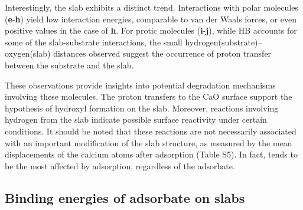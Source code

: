 \documentclass[%
aip,
amsmath,amssymb,
preprint,%
jcp,
showkeys,
]{revtex4-2}
\begin{document}
Interestingly, the  slab exhibits a distinct trend. Interactions with polar molecules (\textbf{e}-\textbf{h}) yield low interaction energies, comparable to van der Waals forces, or even positive values in the case of \textbf{h}. For protic molecules (\textbf{i}-\textbf{j}), while HB accounts for some of the slab-substrate interactions, the small hydrogen(substrate)--oxygen(slab) distances observed suggest the occurrence of proton transfer between the substrate and the slab.

These observations provide insights into potential degradation mechanisms involving these molecules. The proton transfers to the CaO surface support the hypothesis of hydroxyl formation on the slab. Moreover, reactions involving hydrogen from the  slab indicate possible surface reactivity under certain conditions.  It should be noted that these reactions are not necessarily associated with an important modification of the slab structure, as measured by the mean displacements of the calcium atoms after adsorption (Table S5). In fact,  tends to be the most affected by adsorption, regardless of the adsorbate.

\subsection{Binding energies of adsorbate on slabs}\label{sec:BE's}

\newcommand{\XPSsa}[2]{
	\begin{figure}[!h]
		\centering
		\texttt{[image: Figure\#1]}
		\caption{Difference (dotted line) between the XPS spectra before (dashed line) and after (solid line) adsorption for compounds \textbf{#2} on various substrates, as computed using the \cpx{E_\infty} protocol. Letters indicate mean binding energies for bulk (``b"), surface (``s", with $\star$ marking the atom closest to the adsorbate), surface hydroxides (``h"), and different atoms of the adsorbate.}
		\label{fig:spectraXPSads#2}
	\end{figure}
}

\newcommand{\XPSsab}[4]{
	\begin{figure}[p]
		\centering
		\texttt{[image: Figure\#1]}
		\texttt{[image: Figure\#2]}
		\caption{Difference (dotted line) between the XPS spectra before (dashed line) and after (solid line) adsorption for compounds \textbf{#3} (panel a) and \textbf{#4} (panel b) on various substrates, as computed using the \cpx{E_\infty} protocol. Letters indicate mean binding energies for bulk (``b"), surface (``s", with $\star$ marking the atom closest to the adsorbate), surface hydroxides (``h"), and different atoms of the adsorbate.}
		\label{fig:spectraXPSads#3#4}
	\end{figure}
}
\end{document}
